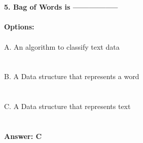 \documentclass[prl,twocolumn,showpacs,preprintnumbers,superscriptaddress]{revtex4}
\theoremstyle{plain}
\theoremstyle{definition}
\begin{document}
\begin{widetext}
\\
\\
\noindent\textbf{5. Bag of Words is -----------------}
\\
\\
\textbf{Options:}
\\
\\
\noindent A. An algorithm to classify text data
\\
\\
\\
B. A Data structure that represents a word
\\
\\
\\
C. A Data structure that represents text
\\
\\
\\
\textbf{Answer: C}
\\
\\
\\
\end{widetext}
\end{document}
